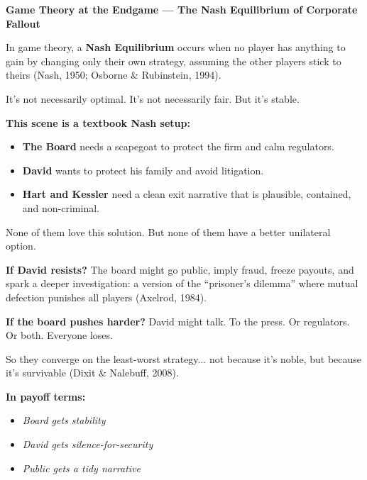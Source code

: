\begin{TechnicalSidebar}{\textbf{Game Theory at the Endgame --- The Nash Equilibrium of Corporate Fallout}}

  In game theory, a \textbf{Nash Equilibrium} occurs when no player has anything to gain by 
  changing only their own strategy, assuming the other players stick to theirs (Nash, 1950; Osborne \& Rubinstein, 1994).

  \medskip

  It’s not necessarily optimal.  
  It’s not necessarily fair.  
  But it’s stable.

  \medskip

  \textbf{This scene is a textbook Nash setup:}

  \medskip

  \begin{itemize}
    \item \textbf{The Board} needs a scapegoat to protect the firm and calm regulators.
    \item \textbf{David} wants to protect his family and avoid litigation.
    \item \textbf{Hart and Kessler} need a clean exit narrative that is plausible, contained, 
    and non-criminal.
  \end{itemize}

  \medskip

  None of them love this solution.  
  But none of them have a better unilateral option.

  \medskip

  \textbf{If David resists?}  
  The board might go public, imply fraud, freeze payouts, and spark a deeper investigation: 
  a version of the ``prisoner's dilemma'' where mutual defection punishes all players (Axelrod, 1984).

  \medskip

  \textbf{If the board pushes harder?}  
  David might talk. To the press. Or regulators. Or both.  
  Everyone loses.

  \medskip

  So they converge on the least-worst strategy... not because it’s noble, but because it’s survivable 
  (Dixit \& Nalebuff, 2008).

  \medskip

  \textbf{In payoff terms:}

  \begin{itemize}
    \item \textit{Board gets stability}
    \item \textit{David gets silence-for-security}
    \item \textit{Public gets a tidy narrative}
  \end{itemize}


\end{TechnicalSidebar}
